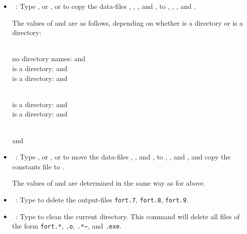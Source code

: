 \documentclass[12pt]{report}
\begin{document}
\begin{itemize}

\item[\tt @cp]~:
  Type , or , or   to
  copy the data-files , ,
  , and , to ,
  , , and .

  The values of  and  are as
  follows, depending on whether  is a directory or
   is a directory:

  \\
  no directory names:  and \\
   is a directory:  and \\
   is a directory:  and 

  \\
   is a directory:  and \\
   is a directory:  and 

  \\
   and 

\item[\tt @mv]~:
   Type , or , or   to
   move the data-files , , and
   , to , , and
   , and copy the constants
   file  to .

   The values of  and  are determined
   in the same way as for  above.

\item[\tt @df]~:
  Type  
  to delete the output-files 
  {\tt fort.7}, {\tt fort.8}, {\tt fort.9}.

\item[\tt @cl]~:
  Type  
  to clean the current directory.
  This command will delete  all files of the form
  {\tt fort.*}, {\tt *.o}, {\tt *.*\~{}}, and {\tt *.exe}.


\end{itemize}
\end{document}

